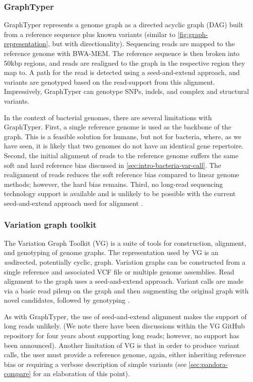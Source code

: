 \subsubsection{GraphTyper}
GraphTyper \cite{graphtyper,graphtyper2} represents a genome graph as a directed acyclic graph (DAG) built from a reference sequence plus known variants (similar to \autoref{fig:graph-representation}, but with directionality). Sequencing reads are mapped to the reference genome with BWA-MEM. The reference sequence is then broken into 50kbp regions, and reads are realigned to the graph in the respective region they map to. A path for the read is detected using a seed-and-extend approach, and variants are genotyped based on the read-support from this alignment. Impressively, GraphTyper can genotype SNPs, indels, and complex and structural variants.

In the context of bacterial genomes, there are several limitations with GraphTyper. First, a single reference genome is used as the backbone of the graph. This is a feasible solution for humans, but not for bacteria, where, as we have seen, it is likely that two genomes do not have an identical gene repertoire. Second, the initial alignment of reads to the reference genome suffers the same soft and hard reference bias discussed in \autoref{sec:intro-bacteria-var-call}. The realignment of reads reduces the soft reference bias compared to linear genome methods; however, the hard bias remains. Third, no long-read sequencing technology support is available and is unlikely to be possible with the current seed-and-extend approach used for alignment \cite{li2018}. 

\subsubsection{Variation graph toolkit}
The Variation Graph Toolkit (VG) \cite{vg2018} is a suite of tools for construction, alignment, and genotyping of genome graphs. The representation used by VG is an \emph{un}directed, potentially cyclic, graph. Variation graphs can be constructed from a single reference and associated VCF file or multiple genome assemblies. Read alignment to the graph uses a seed-and-extend approach. Variant calls are made via a basic read pileup on the graph and then augmenting the original graph with novel candidates, followed by genotyping \cite{Novak2017}.

As with GraphTyper, the use of seed-and-extend alignment makes the support of long reads unlikely. (We note there have been discussions within the VG GitHub repository for four years about supporting long reads; however, no support has been announced). Another limitation of VG is that in order to produce variant calls, the user must provide a reference genome, again, either inheriting reference bias or requiring a verbose description of simple variants (see \autoref{sec:pandora-compare} for an elaboration of this point).

